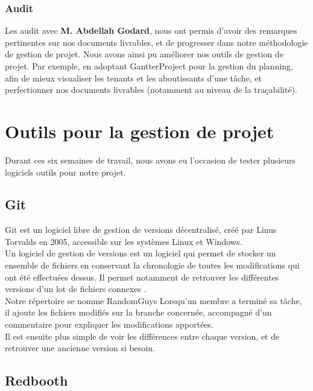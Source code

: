 \subsubsection{Audit}

Les audit avec \textbf{M. Abdellah Godard}, nous ont permis d'avoir des remarques pertinentes sur nos documents livrables, et de progresser dans notre méthodologie de gestion de projet. Nous avons ainsi pu améliorer nos outils de gestion de projet. Par exemple, en adoptant GantterProject pour la gestion du planning, afin de mieux visualiser les tenants et les aboutissants d'une tâche, et perfectionner nos documents livrables (notamment au niveau de la traçabilité).

\section{Outils pour la gestion de projet}

Durant ces six semaines de travail, nous avons eu l'occasion de tester plusieurs logiciels outils pour notre projet.

\subsection{Git}

Git est un logiciel libre de gestion de versions décentralisé, créé par Linus Torvalds en 2005, accessible sur les systèmes Linux et Windows.\\
Un logiciel de gestion de versions est un logiciel qui permet de stocker un ensemble de fichiers en conservant la chronologie de toutes les modifications qui ont été effectuées dessus. Il permet notamment de retrouver les différentes versions d’un lot de fichiers connexes \cite{wikigit}.\\
Notre répertoire se nomme RandomGuys \cite{notregit}
Lorsqu'un membre a terminé sa tâche, il ajoute les fichiers modifiés sur la branche concernée, accompagné d'un commentaire pour expliquer les modifications apportées.\\
Il est ensuite plus simple de voir les différences entre chaque version, et de retrouver une ancienne version si besoin.\\

\subsection{Redbooth}

